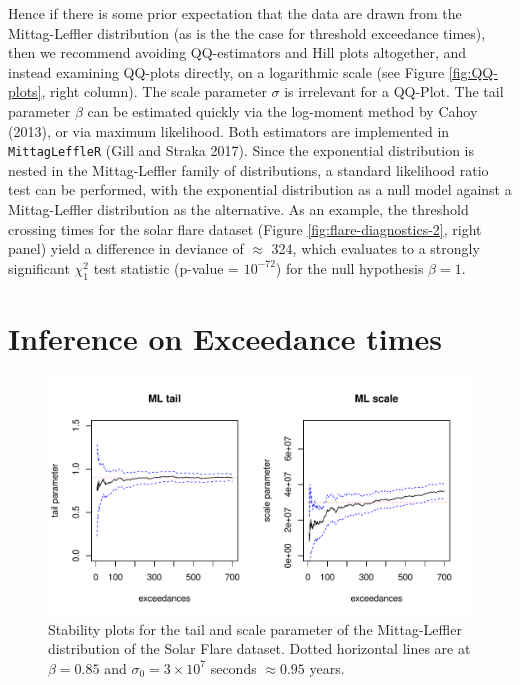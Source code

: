 \documentclass[smallextended]{svjour3}       %
\begin{document}
Hence if there is some prior expectation that the data are drawn from
the Mittag-Leffler distribution (as is the the case for threshold
exceedance times), then we recommend avoiding QQ-estimators and Hill
plots altogether, and instead examining QQ-plots directly, on a
logarithmic scale (see Figure \ref{fig:QQ-plots}, right column). The
scale parameter \(\sigma\) is irrelevant for a QQ-Plot. The tail
parameter \(\beta\) can be estimated quickly via the log-moment method
by Cahoy (2013), or via maximum likelihood. Both estimators are
implemented in \texttt{MittagLeffleR} (Gill and Straka 2017). Since the
exponential distribution is nested in the Mittag-Leffler family of
distributions, a standard likelihood ratio test can be performed, with
the exponential distribution as a null model against a Mittag-Leffler
distribution as the alternative. As an example, the threshold crossing
times for the solar flare dataset (Figure \ref{fig:flare-diagnostics-2},
right panel) yield a difference in deviance of \(\approx\) 324, which
evaluates to a strongly significant \(\chi^2_1\) test statistic (p-value
= \(10^{-72}\)) for the null hypothesis \(\beta = 1\).

\section{Inference on Exceedance
times}\label{inference-on-exceedance-times}

\begin{figure}
\includegraphics[width=\textwidth]{article_springer_files/figure-latex/solar-flare-tail-scale-1} \caption{\label{fig:flares}Stability plots for the tail and scale parameter of the Mittag-Leffler distribution of the Solar Flare dataset. Dotted horizontal lines are at $\beta = 0.85$ and $\sigma_0 = 3 \times 10^7$ seconds $\approx 0.95$ years.}\label{fig:solar-flare-tail-scale}
\end{figure}
\end{document}
